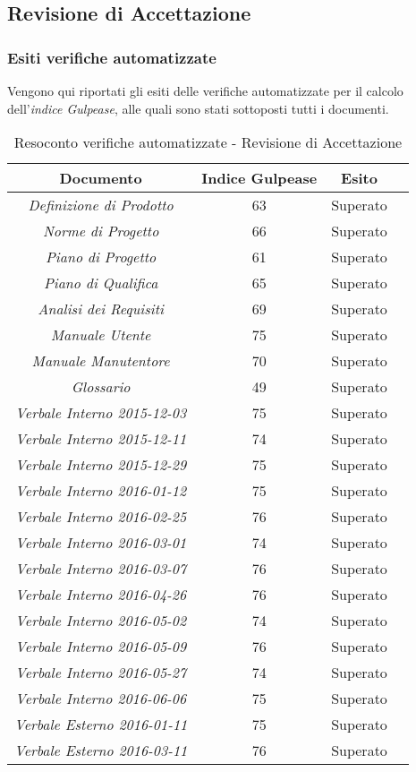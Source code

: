 \subsection{Revisione di Accettazione}

\subsubsection{Esiti verifiche automatizzate}
Vengono qui riportati gli esiti delle verifiche automatizzate per il calcolo dell'\textit{indice Gulpease}, alle quali sono stati sottoposti tutti i documenti.
\begin{table}[h]
\begin{center}
\begin{tabular}{|c|c|c|c|}
\hline \textbf{Documento} & \textbf{Indice Gulpease} & \textbf{Esito}\\
\hline
\emph{Definizione di Prodotto} & 63 & Superato \\
\emph{Norme di Progetto} & 66 & Superato \\
\emph{Piano di Progetto} & 61 & Superato \\
\emph{Piano di Qualifica} & 65 & Superato \\
\emph{Analisi dei Requisiti} & 69 & Superato \\
\emph{Manuale Utente} & 75 & Superato \\
\emph{Manuale Manutentore} & 70 & Superato \\
\emph{Glossario} & 49 & Superato \\
\emph{Verbale Interno 2015-12-03} & 75 & Superato \\
\emph{Verbale Interno 2015-12-11} & 74 & Superato \\
\emph{Verbale Interno 2015-12-29} & 75 & Superato \\
\emph{Verbale Interno 2016-01-12} & 75 & Superato \\
\emph{Verbale Interno 2016-02-25} & 76 & Superato \\
\emph{Verbale Interno 2016-03-01} & 74 & Superato \\
\emph{Verbale Interno 2016-03-07} & 76 & Superato \\
\emph{Verbale Interno 2016-04-26} & 76 & Superato \\
\emph{Verbale Interno 2016-05-02} & 74 & Superato \\
\emph{Verbale Interno 2016-05-09} & 76 & Superato \\
\emph{Verbale Interno 2016-05-27} & 74 & Superato \\
\emph{Verbale Interno 2016-06-06} & 75 & Superato \\
\emph{Verbale Esterno 2016-01-11} & 75 & Superato \\
\emph{Verbale Esterno 2016-03-11} & 76 & Superato \\
\hline
\end{tabular}
\caption{Resoconto verifiche automatizzate - Revisione di Accettazione}
\end{center}
\end{table}

